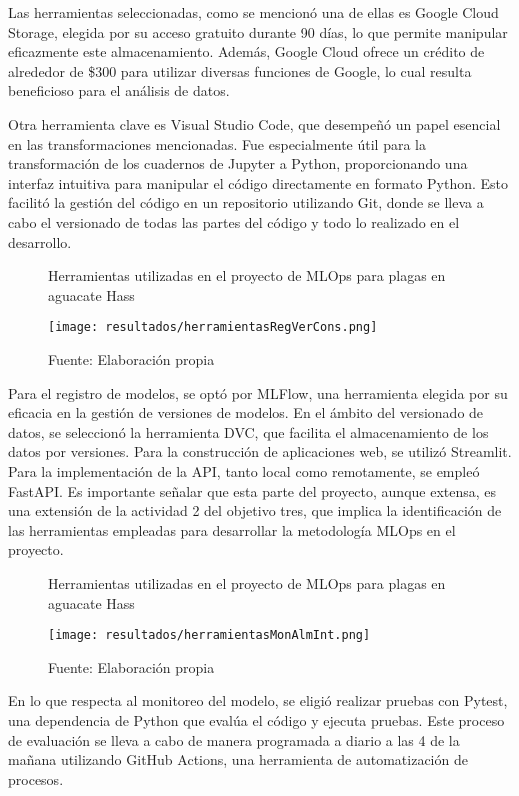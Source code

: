 Las herramientas seleccionadas, como se mencionó una de ellas es Google Cloud Storage, elegida por su acceso gratuito durante 90 días, lo que permite manipular eficazmente este almacenamiento. Además, Google Cloud ofrece un crédito de alrededor de \$300 para utilizar diversas funciones de Google, lo cual resulta beneficioso para el análisis de datos. \newline

Otra herramienta clave es Visual Studio Code, que desempeñó un papel esencial en las transformaciones mencionadas. Fue especialmente útil para la transformación de los cuadernos de Jupyter a Python, proporcionando una interfaz intuitiva para manipular el código directamente en formato Python. Esto facilitó la gestión del código en un repositorio utilizando Git, donde se lleva a cabo el versionado de todas las partes del código y todo lo realizado en el desarrollo.

\begin{figure}[h]
\centering
\caption{Herramientas utilizadas en el proyecto de MLOps para plagas en aguacate Hass}
\texttt{[image: resultados/herramientasRegVerCons.png]}
\caption*{\footnotesize Fuente: Elaboración propia}
\label{fig:figuraHerramientasRegVerCons}
\end{figure}

Para el registro de modelos, se optó por MLFlow, una herramienta elegida por su eficacia en la gestión de versiones de modelos. En el ámbito del versionado de datos, se seleccionó la herramienta DVC, que facilita el almacenamiento de los datos por versiones. Para la construcción de aplicaciones web, se utilizó Streamlit. Para la implementación de la API, tanto local como remotamente, se empleó FastAPI. Es importante señalar que esta parte del proyecto, aunque extensa, es una extensión de la actividad 2 del objetivo tres, que implica la identificación de las herramientas empleadas para desarrollar la metodología MLOps en el proyecto.

\begin{figure}[h]
\centering
\caption{Herramientas utilizadas en el proyecto de MLOps para plagas en aguacate Hass}
\texttt{[image: resultados/herramientasMonAlmInt.png]}
\caption*{\footnotesize Fuente: Elaboración propia}
\label{fig:figuraHerramientasMonAlmInt}
\end{figure}

En lo que respecta al monitoreo del modelo, se eligió realizar pruebas con Pytest, una dependencia de Python que evalúa el código y ejecuta pruebas. Este proceso de evaluación se lleva a cabo de manera programada a diario a las 4 de la mañana utilizando GitHub Actions, una herramienta de automatización de procesos. \newline

